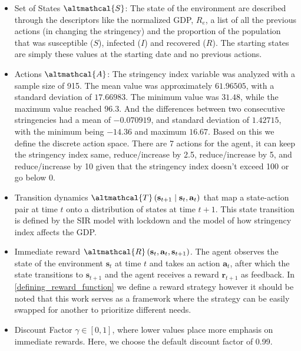 \documentclass[tikz,fleqn,12pt]{wlscirep}
\begin{document}
\begin{itemize}
    \item Set of States $\altmathcal{S}$: The state of the environment are described through the descriptors like the normalized GDP, $R_e$, a list of all the previous actions (in changing the stringency) and the proportion of the population that was susceptible ($S$), infected ($I$) and recovered ($R$). The starting states are simply these values at the starting date and no previous actions.
    \item Actions $\altmathcal{A}$: The stringency index variable was analyzed with a sample size of 915. The mean value was approximately $61.96505$, with a standard deviation of $17.66983$. The minimum value was $31.48$, while the maximum value reached $96.3$. And the differences between two consecutive stringencies had a mean of $-0.070919$, and standard deviation of $1.42715$, with the minimum being $-14.36$ and maximum $16.67$. Based on this we define the discrete action space. There are 7 actions for the agent, it can keep the stringency index same, reduce/increase by 2.5, reduce/increase by 5, and reduce/increase by 10 given that the stringency index doesn't exceed 100 or go below 0.
    \item Transition dynamics $\altmathcal{T}\left(\mathbf{s}_{t+1} \mid \mathbf{s}_t, \mathbf{a}_t\right)$ that map a state-action pair at time $t$ onto a distribution of states at time $t+1$. This state transition is defined by the SIR model with lockdown and the model of how stringency index affects the GDP.
    \item Immediate reward $\altmathcal{R}\left(\mathbf{s}_t, \mathbf{a}_t, \mathbf{s}_{t+1}\right)$. The agent observes the state of the environment $\mathbf{s}_t$ at time $t$ and takes an action $\mathbf{a}_t$, after which the state transitions to $\mathbf{s}_{t+1}$ and the agent receives a reward $\mathbf{r}_{t+1}$ as feedback. In \cref{defining_reward_function} we define a reward strategy however it should be noted that this work serves as a framework where the strategy can be easily swapped for another to prioritize different needs.
    \item Discount Factor $\gamma \in[0,1]$, where lower values place more emphasis on immediate rewards. Here, we choose the default discount factor of 0.99.
\end{itemize}
\end{document}
